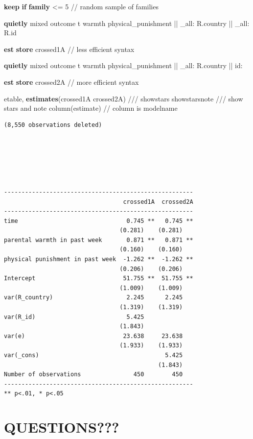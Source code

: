 \documentclass[
  letterpaper,
  DIV=11,
  numbers=noendperiod]{scrreprt}
\newenvironment{Shaded}{\begin{snugshade}}{\end{snugshade}}
\newcommand{\CommentTok}[1]{\textcolor[rgb]{0.37,0.37,0.37}{#1}}
\newcommand{\DataTypeTok}[1]{\textcolor[rgb]{0.68,0.00,0.00}{#1}}
\newcommand{\KeywordTok}[1]{\textcolor[rgb]{0.00,0.23,0.31}{\textbf{#1}}}
\newcommand{\NormalTok}[1]{\textcolor[rgb]{0.00,0.23,0.31}{#1}}
\begin{document}
\begin{Shaded}
\begin{Highlighting}[]

\KeywordTok{keep} \KeywordTok{if} \KeywordTok{family}\NormalTok{ \textless{}= 5 }\CommentTok{// random sample of families}
    
\KeywordTok{quietly}\NormalTok{ mixed outcome t warmth physical\_punishment || }\DataTypeTok{\_all}\NormalTok{: R.country || }\DataTypeTok{\_all}\NormalTok{: R.id}
    
\KeywordTok{est} \KeywordTok{store}\NormalTok{ crossed1A }\CommentTok{// less efficient syntax}
    
\KeywordTok{quietly}\NormalTok{ mixed outcome t warmth physical\_punishment || }\DataTypeTok{\_all}\NormalTok{: R.country || id:}
    
\KeywordTok{est} \KeywordTok{store}\NormalTok{ crossed2A }\CommentTok{// more efficient syntax}
    
\NormalTok{etable, }\KeywordTok{estimates}\NormalTok{(crossed1A crossed2A) }\CommentTok{///}
\NormalTok{showstars showstarsnote }\CommentTok{/// show stars and note}
\NormalTok{column(estimate) }\CommentTok{// column is modelname}
\end{Highlighting}
\end{Shaded}

\begin{verbatim}
(8,550 observations deleted)






------------------------------------------------------
                                  crossed1A  crossed2A
------------------------------------------------------
time                               0.745 **   0.745 **
                                 (0.281)    (0.281)   
parental warmth in past week       0.871 **   0.871 **
                                 (0.160)    (0.160)   
physical punishment in past week  -1.262 **  -1.262 **
                                 (0.206)    (0.206)   
Intercept                         51.755 **  51.755 **
                                 (1.009)    (1.009)   
var(R_country)                     2.245      2.245   
                                 (1.319)    (1.319)   
var(R_id)                          5.425              
                                 (1.843)              
var(e)                            23.638     23.638   
                                 (1.933)    (1.933)   
var(_cons)                                    5.425   
                                            (1.843)   
Number of observations               450        450   
------------------------------------------------------
** p<.01, * p<.05
\end{verbatim}

\section{QUESTIONS???}\label{questions}
\end{document}
